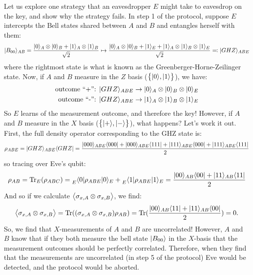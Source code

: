 Let us explore one strategy that an eavesdropper $E$ might take to eavesdrop on the key, and show why the strategy fails. In step 1 of the protocol, suppose $E$ intercepts the Bell states shared between $A$ and $B$ and entangles herself with them:
\begin{equation}
    \lvert B_{00} \rangle_{AB} = \frac{\lvert 0 \rangle_A \otimes \lvert 0 \rangle_B + \lvert 1 \rangle_A \otimes \lvert 1 \rangle_B}{\sqrt{2}} \mapsto \frac{\lvert 0 \rangle_A \otimes \lvert 0 \rangle_B + \lvert 1 \rangle_E + \lvert 1 \rangle_A \otimes \lvert 1 \rangle_B \otimes \lvert 1 \rangle_E}{\sqrt{2}} \eqqcolon \lvert GHZ \rangle_{ABE}
\end{equation}
where the rightmost state is what is known as the Greenberger-Horne-Zeilinger state. Now, if $A$ and $B$ measure in the $Z$ basis ($\set{\lvert 0 \rangle, \lvert 1 \rangle}$), we have:
\begin{equation}
    \begin{split}
        \text{outcome ``+'': } \lvert GHZ \rangle_{ABE} &\to \lvert 0 \rangle_A \otimes \lvert 0 \rangle_B \otimes \lvert 0 \rangle_E
        \\ \text{outcome  ``-'': } \lvert GHZ \rangle_{ABE} &\to \lvert 1 \rangle_A \otimes \lvert 1 \rangle_B \otimes \lvert 1 \rangle_E
    \end{split}
\end{equation}
So $E$ learns of the measurement outcome, and therefore the key! However, if $A$ and $B$ measure in the $X$ basis ($\set{\lvert + \rangle, \lvert - \rangle}$), what happens? Let's work it out. First, the full density operator corresponding to the GHZ state is:
\begin{equation}
    \rho_{ABE} = \lvert GHZ \rangle_{ABE}\langle GHZ \rvert = \frac{\lvert 000 \rangle_{ABE}\langle 000 \rvert + \lvert 000 \rangle_{ABE}\langle 111 \rvert + \lvert 111 \rangle_{ABE}\langle 000 \rvert + \lvert 111 \rangle_{ABE}\langle 111 \rvert}{2}
\end{equation}
so tracing over Eve's qubit:
\begin{equation}
    \rho_{AB} = \mathrm{Tr}_E(\rho_{ABC}) = \prescript{}{E}{\langle 0 \rvert}\rho_{ABE}\lvert 0 \rangle_E + \prescript{}{E}{\langle 1 \rvert}\rho_{ABE}\lvert 1 \rangle_E = \frac{\lvert 00 \rangle_{AB}\langle 00 \rvert + \lvert 11 \rangle_{AB}\langle 11 \rvert}{2}
\end{equation}
And so if we calculate $\left< \sigma_{x, A} \otimes \sigma_{x, B} \right>$, we find:
\begin{equation}
    \left< \sigma_{x, A} \otimes \sigma_{x, B} \right> = \mathrm{Tr}((\sigma_{x, A} \otimes \sigma_{x, B})\rho_{AB}) = \mathrm{Tr}(\frac{\lvert 00 \rangle_{AB}\langle 11 \rvert + \lvert 11 \rangle_{AB}\langle 00 \rvert}{2}) = 0.
\end{equation}
So, we find that $X$-measurements of $A$ and $B$ are uncorrelated! However, $A$ and $B$ know that if they both measure the bell state $\lvert B_{00} \rangle$ in the $X$-basis that the measurement outcomes should be perfectly correlated. Therefore, when they find that the measurements are uncorrelated (in step 5 of the protocol) Eve would be detected, and the protocol would be aborted.

